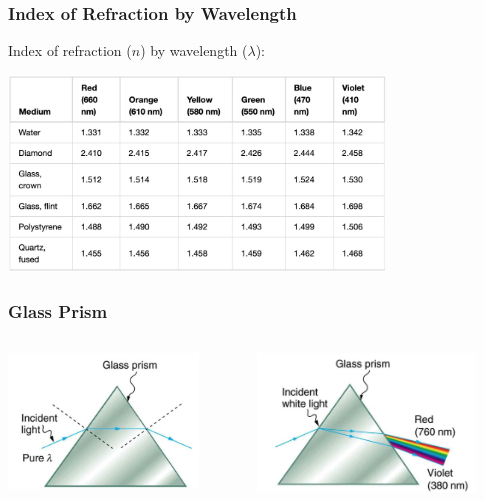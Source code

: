 \documentclass{beamer}
\begin{document}
\begin{frame}\frametitle{Index of Refraction by Wavelength}
Index of refraction ($n$) by wavelength ($\lambda$):

\begin{center}
\includegraphics[width=10cm]{fig/nbylambda.jpg}
\end{center}
\end{frame}


\begin{frame}\frametitle{Glass Prism}
\begin{columns}
\begin{column}{5.5cm}
\begin{center}
\includegraphics[height=3.6cm]{fig/gpideal.jpg}
\end{center}
\end{column}
\begin{column}{5.5cm}
\begin{center}
\includegraphics[height=3.7cm]{fig/gpreal.jpg}
\end{center}
\end{column}
\end{columns}
\end{frame}
\end{document}
